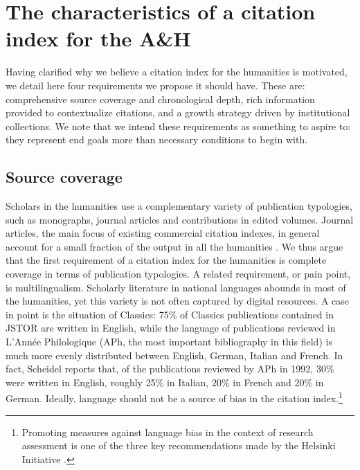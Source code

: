 \section{The characteristics of a citation index for the A\&H}\label{sec:citation-index-characteristics}

Having clarified why we believe a citation index for the humanities is motivated, we detail here four requirements we propose it should have. These are: comprehensive source coverage and chronological depth, rich information provided to contextualize citations, and a growth strategy driven by institutional collections. We note that we intend these requirements as something to aspire to: they represent end goals more than necessary conditions to begin with.

\subsection{Source coverage}
Scholars in the humanities use a complementary variety of publication typologies, such as monographs, journal articles and contributions in edited volumes. Journal articles, the main focus of existing commercial citation indexes, in general account for a small fraction of the output in all the humanities \cite{knievel_citation_2005}. We thus argue that the first requirement of a citation index for the humanities is complete coverage in terms of publication typologies. A related requirement, or pain point, is multilingualism. Scholarly literature in national languages abounds in most of the humanities, yet this variety is not often captured by digital resources. A case in point is the situation of Classics: 75\% of Classics publications contained in JSTOR are written in English, while the language of publications reviewed in L’Année Philologique (APh, the most important bibliography in this field) is much more evenly distributed between English, German, Italian and French. In fact, Scheidel \cite{scheidel_continuity_1997} reports that, of the publications reviewed by APh in 1992, 30\% were written in English, roughly 25\% in Italian, 20\% in French and 20\% in German. Ideally, language should not be a source of bias in the citation index.\footnote{Promoting measures against language bias in the context of research assessment is one of the three key recommendations made by the Helsinki Initiative \cite{federation_of_finnish_learned_societies_helsinki_2019}.}
 
